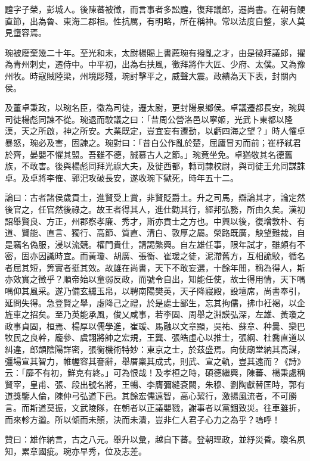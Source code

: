 \begin{pinyinscope}
韙字子榮，彭城人。後陳蕃被徵，而言事者多訟韙，復拜議郎，遷尚書。在朝有鯁直節，出為魯、東海二郡相。性抗厲，有明略，所在稱神。常以法度自整，家人莫見墯容焉。

琬被廢棄幾二十年。至光和末，太尉楊賜上書薦琬有撥亂之才，由是徵拜議郎，擢為青州刺史，遷侍中。中平初，出為右扶風，徵拜將作大匠、少府、太僕。又為豫州牧。時寇賊陸梁，州境彫殘，琬討擊平之，威聲大震。政績為天下表，封關內侯。

及董卓秉政，以琬名臣，徵為司徒，遷太尉，更封陽泉鄉侯。卓議遷都長安，琬與司徒楊彪同諫不從。琬退而駮議之曰：「昔周公營洛邑以寧姬，光武卜東都以隆漢，天之所啟，神之所安。大業既定，豈宜妄有遷動，以虧四海之望？」時人懼卓暴怒，琬必及害，固諫之。琬對曰：「昔白公作亂於楚，屈廬冒刃而前；崔杼弒君於齊，晏嬰不懼其盟。吾雖不德，誠慕古人之節。」琬竟坐免。卓猶敬其名德舊族，不敢害。後與楊彪同拜光祿大夫，及徙西都，轉司隸校尉，與司徒王允同謀誅卓。及卓將李傕、郭汜攻破長安，遂收琬下獄死，時年五十二。

論曰：古者諸侯歲貢士，進賢受上賞，非賢貶爵土。升之司馬，辯論其才，論定然後官之，任官然後祿之。故王者得其人，進仕勸其行，經邦弘務，所由久矣。漢初詔舉賢良、方正，州郡察孝廉、秀才，斯亦貢士之方也。中興以後，復增敦朴、有道、賢能、直言、獨行、高節、質直、清白、敦厚之屬。榮路既廣，觖望難裁，自是竊名偽服，浸以流競。權門貴仕，請謁繁興。自左雄任事，限年試才，雖頗有不密，固亦因識時宜。而黃瓊、胡廣、張衡、崔瑗之徒，泥滯舊方，互相詭駮，循名者屈其短，筭實者挺其效。故雄在尚書，天下不敢妄選，十餘年閒，稱為得人，斯亦效實之徵乎？順帝始以童弱反政，而號令自出，知能任使，故士得用情，天下喁喁仰其風采。遂乃備玄纁玉帛，以聘南陽樊英，天子降寢殿，設壇席，尚書奉引，延問失得。急登賢之舉，虛降己之禮，於是處士鄙生，忘其拘儒，拂巾衽褐，以企旌車之招矣。至乃英能承風，俊乂咸事，若李固、周舉之淵謨弘深，左雄、黃瓊之政事貞固，桓焉、楊厚以儒學進，崔瑗、馬融以文章顯，吳祐、蘇章、种暠、欒巴牧民之良幹，龐參、虞詡將帥之宏規，王龔、張皓虛心以推士，張綱、杜喬直道以糾違，郎顗陰陽詳密，張衡機術特妙：東京之士，於茲盛焉。向使廟堂納其高謀，彊場宣其智力，帷幄容其謇辭，舉厝稟其成式，則武、宣之軌，豈其遠而？《詩》云：「靡不有初，鮮克有終。」可為恨哉！及孝桓之時，碩德繼興，陳蕃、楊秉處稱賢宰，皇甫、張、段出號名將，王暢、李膺彌縫袞闕，朱穆、劉陶獻替匡時，郭有道獎鑒人倫，陳仲弓弘道下邑。其餘宏儒遠智，高心絜行，激揚風流者，不可勝言。而斯道莫振，文武陵隊，在朝者以正議嬰戮，謝事者以黨錮致災。往車雖折，而來軫方遒。所以傾而未顛，決而未潰，豈非仁人君子心力之為乎？嗚呼！

贊曰：雄作納言，古之八元。舉升以彙，越自下蕃。登朝理政，並紓災昏。瓊名夙知，累章國疵。琬亦早秀，位及志差。


\end{pinyinscope}